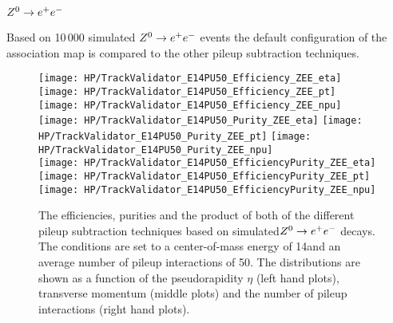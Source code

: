\subsubsection{$\Zz\rightarrow\EE$}

Based on 10\,000 simulated  $\Zz\rightarrow\EE$ events the default configuration of the association map is compared to the other pileup subtraction techniques.

\begin{figure}[!h]
  \centering
  \texttt{[image: HP/TrackValidator\_E14PU50\_Efficiency\_ZEE\_eta]}
  \texttt{[image: HP/TrackValidator\_E14PU50\_Efficiency\_ZEE\_pt]}
  \texttt{[image: HP/TrackValidator\_E14PU50\_Efficiency\_ZEE\_npu]}
   \\
  \texttt{[image: HP/TrackValidator\_E14PU50\_Purity\_ZEE\_eta]}
  \texttt{[image: HP/TrackValidator\_E14PU50\_Purity\_ZEE\_pt]}
  \texttt{[image: HP/TrackValidator\_E14PU50\_Purity\_ZEE\_npu]}
   \\
  \texttt{[image: HP/TrackValidator\_E14PU50\_EfficiencyPurity\_ZEE\_eta]}
  \texttt{[image: HP/TrackValidator\_E14PU50\_EfficiencyPurity\_ZEE\_pt]}
  \texttt{[image: HP/TrackValidator\_E14PU50\_EfficiencyPurity\_ZEE\_npu]}
  \caption[Efficiencies, purities and their product of the different pileup subtraction techniques based $\Zz\rightarrow\EE$ decays with 14\TeV and $\left<PU\right>=50$]{The efficiencies, purities and the product of both of the different pileup subtraction techniques based on simulated$\Zz\rightarrow\EE$ decays. The conditions are set to a center-of-mass energy of 14\TeV and an average number of pileup interactions of 50. The distributions are shown as a function of the pseudorapidity $\eta$ (left hand plots), transverse momentum (middle plots) and the number of pileup interactions (right hand plots).}
\end{figure}
\clearpage

